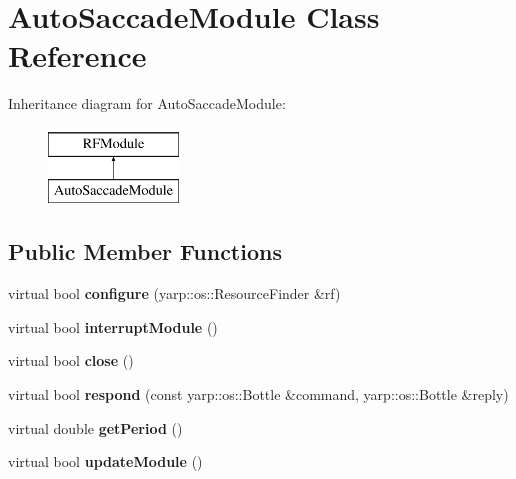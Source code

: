 \hypertarget{classAutoSaccadeModule}{}\section{Auto\+Saccade\+Module Class Reference}
\label{classAutoSaccadeModule}
Inheritance diagram for Auto\+Saccade\+Module\+:\begin{figure}[H]
\begin{center}
\leavevmode
\includegraphics[height=2.000000cm]{classAutoSaccadeModule}
\end{center}
\end{figure}
\subsection*{Public Member Functions}
\begin{DoxyCompactItemize}
\item 
virtual bool {\bfseries configure} (yarp\+::os\+::\+Resource\+Finder \&rf)\hypertarget{classAutoSaccadeModule_a1a912da87f48512567024079a5db2676}{}\label{classAutoSaccadeModule_a1a912da87f48512567024079a5db2676}

\item 
virtual bool {\bfseries interrupt\+Module} ()\hypertarget{classAutoSaccadeModule_a287fec90d0e45f6f0b51b7f0dac33380}{}\label{classAutoSaccadeModule_a287fec90d0e45f6f0b51b7f0dac33380}

\item 
virtual bool {\bfseries close} ()\hypertarget{classAutoSaccadeModule_a93e88144dd31b671adb6a68ec3fd30b3}{}\label{classAutoSaccadeModule_a93e88144dd31b671adb6a68ec3fd30b3}

\item 
virtual bool {\bfseries respond} (const yarp\+::os\+::\+Bottle \&command, yarp\+::os\+::\+Bottle \&reply)\hypertarget{classAutoSaccadeModule_ac55e366df0b53aed2aa872fb171b439f}{}\label{classAutoSaccadeModule_ac55e366df0b53aed2aa872fb171b439f}

\item 
virtual double {\bfseries get\+Period} ()\hypertarget{classAutoSaccadeModule_a389e0a4d1e17fc5d669bc499854ca6e3}{}\label{classAutoSaccadeModule_a389e0a4d1e17fc5d669bc499854ca6e3}

\item 
virtual bool {\bfseries update\+Module} ()\hypertarget{classAutoSaccadeModule_a5812e03b212a3fbc960990ce699ae6b7}{}\label{classAutoSaccadeModule_a5812e03b212a3fbc960990ce699ae6b7}

\end{DoxyCompactItemize}


